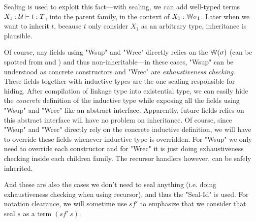 Sealing is used to exploit this fact---with sealing, we can add well-typed terms $X_1 : {\mathcal{U}} \vdash t : T$, into the parent family, in the context of $ X_1 : {\mathbb{W}} \sigma_1$. Later when we want to inherit $t$, because $t$ only consider $X_1$ as an arbitrary type, inheritance is plausible.

Of course, any fields using "Wsup" and "Wrec" directly relies on the ${\mathbb{W}}(\sigma)$ (can be spotted from  and ) and thus non-inheritable---in these cases, "Wsup" can be understood as concrete constructors and "Wrec" are \textit{exhaustiveness checking}. These fields together with inductive types are the one sealing responsible for hiding. After compilation of linkage type into existential type, we can easily hide the \textit{concrete} definition of the inductive type while exposing all the fields using "Wsup" and "Wrec" like an abstract interface. Apparently, future fields relies on this abstract interface will have no problem on inheritance. 
Of course, since "Wsup" and "Wrec" directly rely on the concrete inductive definition, we will have to override these fields whenever inductive type is overridden. For "Wsup" we only need to override each constructor and for "Wrec" it is just doing exhaustiveness checking inside each children family. The recursor handlers however, can be safely inherited.


And these are also the cases we don't need to seal anything (i.e. doing exhaustiveness checking when using recursor), and thus the "Seal-Id" is used. For notation clearance, we will sometime use $sf'$ to emphasize that we consider that seal $s$ as a term $(sf' \ s)$. 


